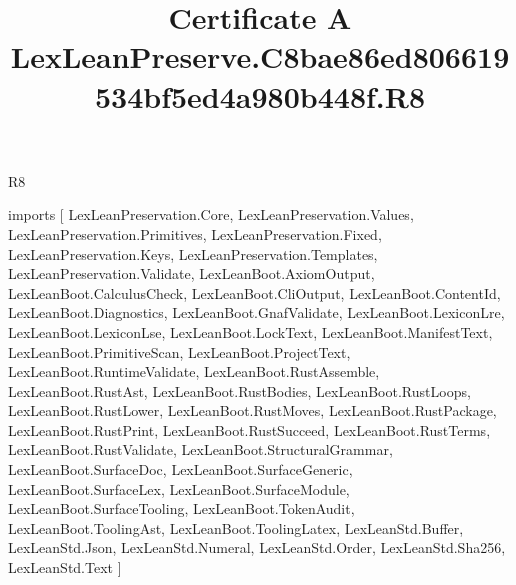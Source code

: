 \begin{lexlean}{R8}
\title{Certificate A LexLeanPreserve.C8bae86ed806619534bf5ed4a980b448f.R8}
\begin{coremodule}
imports [
  LexLeanPreservation.Core,
  LexLeanPreservation.Values,
  LexLeanPreservation.Primitives,
  LexLeanPreservation.Fixed,
  LexLeanPreservation.Keys,
  LexLeanPreservation.Templates,
  LexLeanPreservation.Validate,
  LexLeanBoot.AxiomOutput,
  LexLeanBoot.CalculusCheck,
  LexLeanBoot.CliOutput,
  LexLeanBoot.ContentId,
  LexLeanBoot.Diagnostics,
  LexLeanBoot.GnafValidate,
  LexLeanBoot.LexiconLre,
  LexLeanBoot.LexiconLse,
  LexLeanBoot.LockText,
  LexLeanBoot.ManifestText,
  LexLeanBoot.PrimitiveScan,
  LexLeanBoot.ProjectText,
  LexLeanBoot.RuntimeValidate,
  LexLeanBoot.RustAssemble,
  LexLeanBoot.RustAst,
  LexLeanBoot.RustBodies,
  LexLeanBoot.RustLoops,
  LexLeanBoot.RustLower,
  LexLeanBoot.RustMoves,
  LexLeanBoot.RustPackage,
  LexLeanBoot.RustPrint,
  LexLeanBoot.RustSucceed,
  LexLeanBoot.RustTerms,
  LexLeanBoot.RustValidate,
  LexLeanBoot.StructuralGrammar,
  LexLeanBoot.SurfaceDoc,
  LexLeanBoot.SurfaceGeneric,
  LexLeanBoot.SurfaceLex,
  LexLeanBoot.SurfaceModule,
  LexLeanBoot.SurfaceTooling,
  LexLeanBoot.TokenAudit,
  LexLeanBoot.ToolingAst,
  LexLeanBoot.ToolingLatex,
  LexLeanStd.Buffer,
  LexLeanStd.Json,
  LexLeanStd.Numeral,
  LexLeanStd.Order,
  LexLeanStd.Sha256,
  LexLeanStd.Text
]


\end{coremodule}
\end{lexlean}

